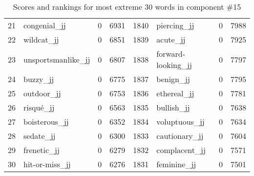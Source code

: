 \begin{table}[tbp]
\begin{tabular}{| rlr@{.}l | rlr@{.}l |}
    21 & congenial\_jj & 0 & 6931    &    1840 & piercing\_jj & 0 & 7988 \\
    22 & wildcat\_jj & 0 & 6851    &    1839 & acute\_jj & 0 & 7925 \\
    23 & unsportsmanlike\_jj & 0 & 6807    &    1838 & forward-looking\_jj & 0 & 7797 \\
    24 & buzzy\_jj & 0 & 6775    &    1837 & benign\_jj & 0 & 7795 \\
    25 & outdoor\_jj & 0 & 6753    &    1836 & ethereal\_jj & 0 & 7781 \\
    26 & risqué\_jj & 0 & 6563    &    1835 & bullish\_jj & 0 & 7638 \\
    27 & boisterous\_jj & 0 & 6352    &    1834 & voluptuous\_jj & 0 & 7634 \\
    28 & sedate\_jj & 0 & 6300    &    1833 & cautionary\_jj & 0 & 7604 \\
    29 & frenetic\_jj & 0 & 6279    &    1832 & complacent\_jj & 0 & 7571 \\
    30 & hit-or-miss\_jj & 0 & 6276    &    1831 & feminine\_jj & 0 & 7501 \\
    \hline
    \end{tabular}
    \caption{Scores and rankings for most extreme 30 words in component \#15} 
\end{table}
\clearpage
